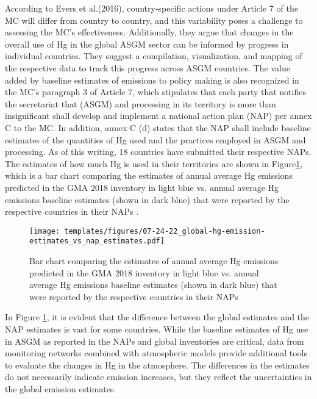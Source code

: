 According to Evers et al.(2016), country-specific actions under Article 7 of the MC will differ from country to country, and this variability poses a challenge to assessing the MC's effectiveness. Additionally, they argue that changes in the overall use of Hg in the global ASGM sector can be informed by progress in individual countries. They suggest a compilation, visualization, and mapping of the respective data to track this progress across ASGM countries.  The value added by baseline estimates of emissions to policy making is also recognized in the MC's paragraph 3 of Article 7, which stipulates that each party that notifies the secretariat that (ASGM) and processing in its territory is more than insignificant shall develop and implement a national action plan (NAP) per annex C to the MC. In addition, annex C (d) states that the NAP shall include baseline estimates of the quantities of Hg used and the practices employed in ASGM and processing. As of this writing, 18 countries have submitted their respective NAPs. The estimates of how much Hg is used in their territories are shown in Figure\ref{fig:global-hg-emission-estimates_vs_nap_estimates}, which is a bar chart comparing the estimates of annual average Hg emissions predicted in the GMA 2018 inventory in light blue vs. annual average Hg emissions baseline estimates (shown in dark blue) that were reported by the respective countries in their NAPs \cite{united_nations_environment_programme_technical_2019}.

\begin{figure}[H]
  \texttt{[image: templates/figures/07-24-22\_global-hg-emission-estimates\_vs\_nap\_estimates.pdf]}
  \centering
  \caption{Bar chart comparing the estimates of annual average Hg emissions predicted in the GMA 2018 inventory in light blue vs. annual average Hg emissions baseline estimates (shown in dark blue) that were reported by the respective countries in their NAPs \cite{united_nations_environment_programme_technical_2019} }
  \label{fig:global-hg-emission-estimates_vs_nap_estimates}
\end{figure}
\FloatBarrier
\begin{flushleft}
 In Figure \ref{fig:global-hg-emission-estimates_vs_nap_estimates}, it is evident that the difference between the global estimates and the NAP estimates is vast for some countries. While the baseline estimates of Hg use in ASGM as reported in the NAPs and global inventories are critical, data from monitoring networks combined with atmospheric models provide additional tools to evaluate the changes in Hg in the atmosphere. The differences in the estimates do not necessarily indicate emission increases, but they reflect the uncertainties in the global emission estimates. 
\end{flushleft} 

